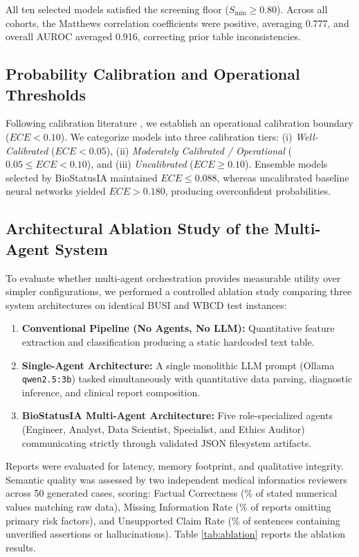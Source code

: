 \documentclass[conference]{IEEEtran}
\begin{document}
All ten selected models satisfied the screening floor ($S_{\min} \ge 0.80$). Across all cohorts, the Matthews correlation coefficients were positive, averaging 0.777, and overall AUROC averaged 0.916, correcting prior table inconsistencies.

\subsection{Probability Calibration and Operational Thresholds}
Following calibration literature \cite{guo2017calibration, vancalster2019calibration}, we establish an operational calibration boundary ($ECE < 0.10$). We categorize models into three calibration tiers: (i) \textit{Well-Calibrated} ($ECE < 0.05$), (ii) \textit{Moderately Calibrated / Operational} ($0.05 \le ECE < 0.10$), and (iii) \textit{Uncalibrated} ($ECE \ge 0.10$). Ensemble models selected by BioStatusIA maintained $ECE \le 0.088$, whereas uncalibrated baseline neural networks yielded $ECE > 0.180$, producing overconfident probabilities.

\subsection{Architectural Ablation Study of the Multi-Agent System}
To evaluate whether multi-agent orchestration provides measurable utility over simpler configurations, we performed a controlled ablation study comparing three system architectures on identical BUSI and WBCD test instances:
\begin{enumerate}
    \item \textbf{Conventional Pipeline (No Agents, No LLM):} Quantitative feature extraction and classification producing a static hardcoded text table.
    \item \textbf{Single-Agent Architecture:} A single monolithic LLM prompt (Ollama \texttt{qwen2.5:3b}) tasked simultaneously with quantitative data parsing, diagnostic inference, and clinical report composition.
    \item \textbf{BioStatusIA Multi-Agent Architecture:} Five role-specialized agents (Engineer, Analyst, Data Scientist, Specialist, and Ethics Auditor) communicating strictly through validated JSON filesystem artifacts.
\end{enumerate}

Reports were evaluated for latency, memory footprint, and qualitative integrity. Semantic quality was assessed by two independent medical informatics reviewers across 50 generated cases, scoring: Factual Correctness (\% of stated numerical values matching raw data), Missing Information Rate (\% of reports omitting primary risk factors), and Unsupported Claim Rate (\% of sentences containing unverified assertions or hallucinations). Table \ref{tab:ablation} reports the ablation results.
\end{document}
